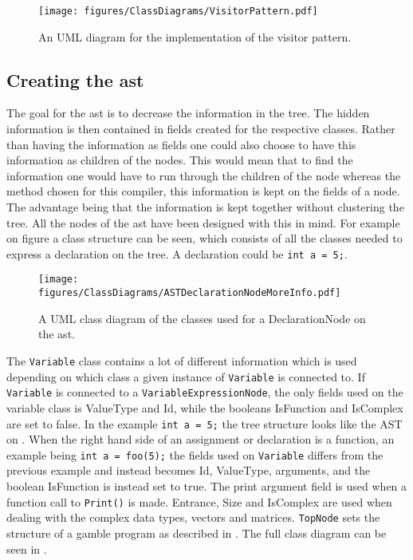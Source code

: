 \begin{figure}[!ht]
\centering
 \texttt{[image: figures/ClassDiagrams/VisitorPattern.pdf]} %
\caption{An UML diagram for the implementation of the visitor pattern.}\label{image:visitor}
\vspace{-15pt}
\end{figure}

\subsection{Creating the \acrshort{ast}}\label{CreatingAst}

The goal for the \acrshort{ast} is to decrease the information in the tree.
The hidden information is then contained in fields created for the respective classes.
Rather than having the information as fields one could also choose to have this information as children of the nodes.
This would mean that to find the information one would have to run through the children of the node whereas the method chosen for this compiler, this information is kept on the fields of a node.
The advantage being that the information is kept together without clustering the tree.
All the nodes of the \acrshort{ast} have been designed with this in mind.
For example on figure  a class structure can be seen, which consists of all the classes needed to express a declaration on the tree.
A declaration could be \texttt{int a = 5;}.

\begin{figure}[!ht]
\centering
 \texttt{[image: figures/ClassDiagrams/ASTDeclarationNodeMoreInfo.pdf]} %
\caption{A UML class diagram of the classes used for a DeclarationNode on the \acrshort{ast}.}\label{image:ASTDecl}
\vspace{-15pt}
\end{figure}

The \texttt{Variable} class contains a lot of different information which is used depending on which class a given instance of \texttt{Variable} is connected to.
If \texttt{Variable} is connected to a \texttt{VariableExpressionNode}, the only fields used on the variable class is ValueType and Id, while the booleans IsFunction and IsComplex are set to false.
In the example \texttt{int a = 5;} the tree structure looks like the AST on .
When the right hand side of an assignment or declaration is a function, an example being \texttt{int a = foo(5);} the fields used on \texttt{Variable} differs from the previous example and instead becomes Id, ValueType, arguments, and the boolean IsFunction is instead set to true.
The print argument field is used when a function call to \texttt{Print()} is made. 
Entrance, Size and IsComplex are used when dealing with the complex data types, vectors and matrices.
\texttt{TopNode} sets the structure of a \gls{gamble} program as described in .
The full class diagram can be seen in .

